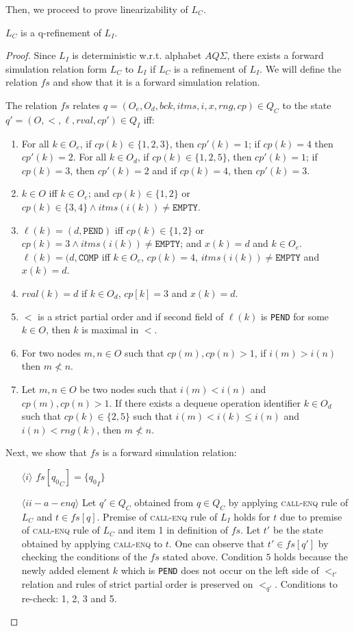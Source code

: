 Then, we proceed to prove linearizability of $L_C$.
\begin{lem}
$L_C$ is a q-refinement of $L_I$.
\end{lem}
\begin{proof}
Since $L_I$ is deterministic w.r.t. alphabet $AQ\Sigma$, there exists a forward simulation relation form $L_C$ to $L_I$ if $L_C$ is a refinement of $L_I$. We will define the relation $fs$ and show that it is a forward simulation relation.

The relation $fs$ relates $q = (O_e, O_d, bck, itms, i,x, rng, cp) \in Q_C$ to the state $q'=(O,<,\ell,rval,cp') \in Q_I$ iff:
\begin{enumerate}
\item For all $k \in O_e$, if $cp(k) \in \{1,2, 3\}$, then $cp'(k) = 1$; if $cp(k) = 4$ then $cp'(k)=2$. For all $k \in O_d$, if $cp(k) \in \{1,2,5\}$, then $cp'(k) = 1$; if $cp(k) = 3$, then $cp'(k)=2$ and if $cp(k)=4$, then $cp'(k)=3$. 
\item $k \in O$ iff $k \in O_e$; and $cp(k) \in \{1,2\}$ or $cp(k) \in \{3,4\} \wedge itms(i(k)) \neq \texttt{EMPTY}$.
\item $\ell(k)= (d, \texttt{PEND})$ iff $cp(k) \in \{1,2\}$ or $cp(k) =3 \wedge itms(i(k)) \neq \texttt{EMPTY}$; and $x(k) = d$ and $k \in O_e$. $\ell(k) = (d,\texttt{COMP}$ iff $k \in O_e$, $cp(k) = 4$, $itms(i(k)) \neq \texttt{EMPTY}$ and $x(k)=d$. 
\item $rval(k)=d$ if $k \in O_d$, $cp[k] = 3$ and $x(k) = d$.
\item $<$ is a strict partial order and if second field of $\ell(k)$ is \texttt{PEND} for some $k \in O$, then $k$ is maximal in $<$.
\item For two nodes $m,n \in O$ such that $cp(m), cp(n) > 1$, if $i(m) > i(n)$ then $m \nless n$.
\item Let $m,n \in O$ be two nodes such that $i(m) < i(n)$ and $cp(m), cp(n) > 1$. If there exists a dequeue operation identifier $k \in O_d$ such that $cp(k) \in \{2,5 \}$ such that $i(m) < i(k) \leq i(n)$ and $i(n) < rng(k)$, then $m \nless n$.
\end{enumerate}
Next, we show that $fs$ is a forward simulation relation:
\begin{itemize}
\item[$\langle i \rangle$] $fs[{q_0}_C] = \{ {q_0}_I \}$
\item[$\langle ii-a-enq \rangle$] Let $q' \in Q_C$ obtained from $q \in Q_C$ by applying \textsc{call-enq} rule of $L_C$ and $t \in fs[q]$. Premise of \textsc{call-enq} rule of $L_I$ holds for $t$ due to premise of \textsc{call-enq} rule of $L_C$ and item 1 in definition of $fs$. Let $t'$ be the state obtained by applying \textsc{call-enq} to $t$. One can observe that $t' \in fs[q']$ by checking the conditions of the $fs$ stated above. Condition $5$ holds because the newly added element $k$ which is \texttt{PEND}  does not occur on the left side of $<_{t'}$ relation and rules of strict partial order is preserved on $<_{q'}$. Conditions to re-check: 1, 2, 3 and 5. 

\end{itemize}
\end{proof}
